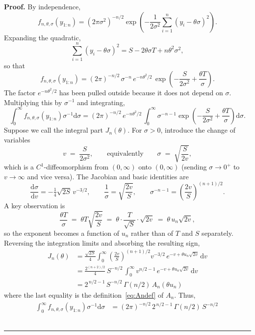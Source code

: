 \documentclass{article}%
\newenvironment{proof}[1][Proof]{\noindent\textbf{#1.} }{\ \rule{0.5em}{0.5em}}
\newcommand{\diff}{\mathrm{d}}
\newcommand{\1}{\mathbf{1}}
\begin{document}
\begin{proof}
By independence,
\[
f_{n,\theta,\sigma}(y_{1:n})
= (2\pi\sigma^{2})^{-n/2}\exp\!\left(
   -\frac{1}{2\sigma^{2}}\sum_{i=1}^{n}(y_i-\theta\sigma)^{2}\right).
\]
Expanding the quadratic,
\[
\sum_{i=1}^{n}(y_i-\theta\sigma)^{2}
= S - 2\theta\sigma T + n\theta^{2}\sigma^{2},
\]
so that
\[
f_{n,\theta,\sigma}(y_{1:n})
= (2\pi)^{-n/2}\,\sigma^{-n}\,
  e^{-n\theta^{2}/2}\,
  \exp\!\left(-\frac{S}{2\sigma^{2}} + \frac{\theta T}{\sigma}\right).
\]
The factor $e^{-n\theta^{2}/2}$ has been pulled outside because it does not depend on $\sigma$. Multiplying this by $\sigma^{-1}$ and integrating,
\begin{equation}
\label{eq:Ipre}
\int_{0}^{\infty}\! f_{n,\theta,\sigma}(y_{1:n})\sigma^{-1}\diff\sigma
= (2\pi)^{-n/2}\,e^{-n\theta^{2}/2}\,
\int_{0}^{\infty}\!\sigma^{-n-1}
   \exp\!\left(-\frac{S}{2\sigma^{2}}+\frac{\theta T}{\sigma}\right)\diff\sigma.
\end{equation}
Suppose we call the integral part $J_n(\theta)$. For $\sigma>0$, introduce the change of variables
\[
v \;=\; \frac{S}{2\sigma^{2}},
\qquad\text{equivalently}\qquad
\sigma \;=\; \sqrt{\frac{S}{2v}},
\]
which is a $C^{1}$-diffeomorphism from $(0,\infty)$ onto $(0,\infty)$ (sending
$\sigma\to 0^{+}$ to $v\to\infty$ and vice versa). The Jacobian and basic
identities are
\[
\frac{\diff\sigma}{\diff v}
= -\tfrac{1}{4}\sqrt{2S}\,v^{-3/2},
\qquad
\frac{1}{\sigma}=\sqrt{\frac{2v}{S}},
\qquad
\sigma^{-n-1}=\left(\frac{2v}{S}\right)^{(n+1)/2}.
\]
A key observation is
\[
\frac{\theta T}{\sigma}
\;=\;\theta T\sqrt{\frac{2v}{S}}
\;=\;\theta \cdot \frac{T}{\sqrt{S}}\cdot \sqrt{2v}
\;=\;\theta\, u_n \sqrt{2v},
\]
so the exponent becomes a function of $u_n$ rather than of $T$ and $S$
separately. Reversing the integration limits and absorbing the resulting
sign,
\begin{align*}
J_n(\theta)
& = \frac{\sqrt{2S}}{4}
\int_{0}^{\infty}\!\left(\frac{2v}{S}\right)^{\!(n+1)/2}\! v^{-3/2}\,
e^{-v + \theta u_n\sqrt{2v}}\,\diff v\\
& = \frac{2^{(n+2)/2}}{4}\, S^{-n/2}\,
   \int_{0}^{\infty}\! v^{n/2-1}\,
   e^{-v + \theta u_n\sqrt{2v}}\,\diff v\\
& = 2^{\,n/2-1}\, S^{-n/2}\, \Gamma(n/2)\, A_n(\theta u_n)
\end{align*}
where the last equality is the definition~\eqref{eq:Andef} of $A_n$. Thus,
\begin{align*}
\int_{0}^{\infty} f_{n,\theta,\sigma}(y_{1:n})\sigma^{-1}\diff\sigma
&= (2\pi)^{-n/2}\,2^{\,n/2-1}\,\Gamma(n/2)\,S^{-n/2}\,

\end{align*}
\end{proof}
\end{document}
